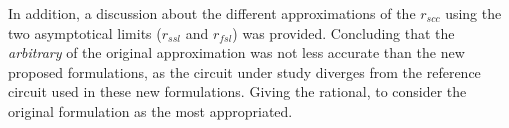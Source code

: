 In addition, a discussion about the different approximations of the $r_{scc}$ using the two asymptotical limits ($r_{ssl}$ and $r_{fsl}$) was provided. Concluding that the \emph{arbitrary} of the original approximation was not less accurate than the new proposed formulations, as the circuit under study diverges from the reference circuit used in these new formulations. Giving the rational, to consider the original formulation as the most appropriated.

\clearpage

 